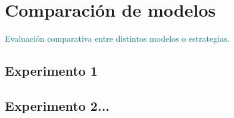 \section{Comparación de modelos}
\textcolor{teal}{Evaluación comparativa entre distintos modelos o estrategias.}
\subsection{Experimento 1}
\subsection{Experimento 2...}
